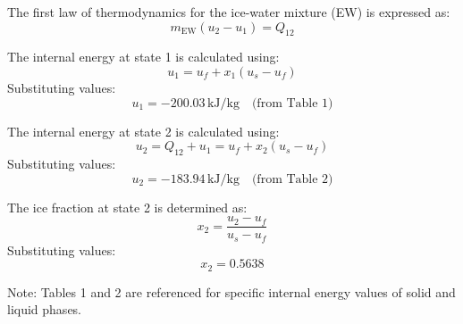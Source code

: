 The first law of thermodynamics for the ice-water mixture (EW) is expressed as:  
\[
m_{\text{EW}} (u_2 - u_1) = Q_{12}
\]  

The internal energy at state 1 is calculated using:  
\[
u_1 = u_f + x_1 (u_s - u_f)
\]  
Substituting values:  
\[
u_1 = -200.03 \, \text{kJ/kg} \quad \text{(from Table 1)}
\]  

The internal energy at state 2 is calculated using:  
\[
u_2 = Q_{12} + u_1 = u_f + x_2 (u_s - u_f)
\]  
Substituting values:  
\[
u_2 = -183.94 \, \text{kJ/kg} \quad \text{(from Table 2)}
\]  

The ice fraction at state 2 is determined as:  
\[
x_2 = \frac{u_2 - u_f}{u_s - u_f}
\]  
Substituting values:  
\[
x_2 = 0.5638
\]  

Note: Tables 1 and 2 are referenced for specific internal energy values of solid and liquid phases.